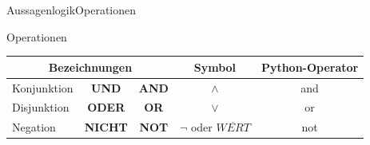 \documentclass[xelatex,aspectratio=169]{beamer}
\begin{document}
\begin{frame}{Aussagenlogik}{Operationen}
  \begin{block}{Operationen}
    \centering
    \begin{tabular}{lcccc}
      \toprule
      \multicolumn{3}{c}{\textbf{Bezeichnungen}} & \textbf{Symbol} & \textbf{Python-Operator}                                            \\
      \midrule
      Konjunktion                                & \textbf{UND}    & \textbf{AND}             & \(\land\)                          & and \\
      Disjunktion                                & \textbf{ODER}   & \textbf{OR}              & \(\lor\)                           & or  \\
      Negation                                   & \textbf{NICHT}  & \textbf{NOT}             & \(\lnot\) oder \(\overline{WERT}\) & not \\
      \toprule
    \end{tabular}
  \end{block}
\end{frame}
\end{document}
